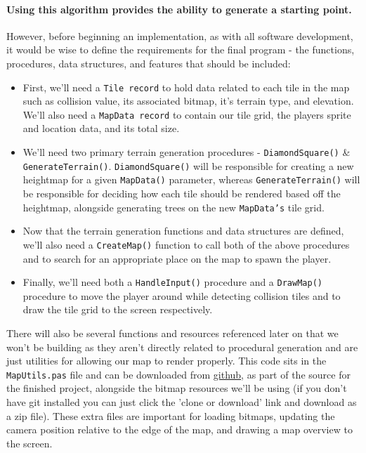 \documentclass{article}
\begin{document}
\paragraph{Using this algorithm provides the ability to generate a starting point.}
However, before beginning an implementation, as with all software development, it would be wise to define the requirements for the final program - the functions, procedures, data structures, and features that should be included:
\begin{itemize}

\item
	First, we'll need a \texttt{Tile record} to hold data related to each tile in the map such as collision value, its associated bitmap, it's terrain type, and elevation. We'll also need a \texttt{MapData record} to contain our tile grid, the players sprite and location data, and its total size.
\item
	We'll need two primary terrain generation procedures - \texttt{DiamondSquare()} \& \texttt{GenerateTerrain()}. \texttt{DiamondSquare()} will be responsible for creating a new heightmap for a given \texttt{MapData()} parameter, whereas \texttt{GenerateTerrain()} will be responsible for deciding how each tile should be rendered based off the heightmap, alongside generating trees on the new \texttt{MapData's} tile grid.
\item
	Now that the terrain generation functions and data structures are defined, we'll also need a \texttt{CreateMap()} function to call both of the above procedures and to search for an appropriate place on the map to spawn the player.
\item
	Finally, we'll need both a \texttt{HandleInput()} procedure and a \texttt{DrawMap()} procedure to move the player around while detecting collision tiles and to draw the tile grid to the screen respectively.
	
\end{itemize}

There will also be several functions and resources referenced later on that we won't be building as they aren't directly related to procedural generation and are just utilities for allowing our map to render properly. This code sits in the \texttt{MapUtils.pas} file and can be downloaded from \href{https://github.com/jacobmilligan/intro_hd_report}{github}, as part of the source for the finished project, alongside the bitmap resources we'll be using (if you don't have git installed you can just click the 'clone or download' link and download as a zip file). These extra files are important for loading bitmaps, updating the camera position relative to the edge of the map, and drawing a map overview to the screen.
\end{document}
